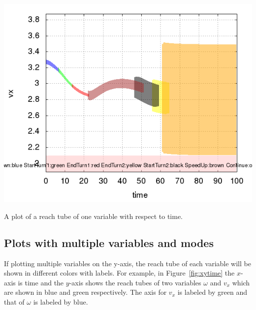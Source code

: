 \documentclass{tufte-book} %
\begin{document}
\begin{marginfigure}
 \centerline{\includegraphics[scale=.24,keepaspectratio=true]{Manual_ver0_2_image/plot_open.png}}
 \caption{A plot of a reach tube of one variable with respect to time.} 
 \label{fig:reachtube_plot}
\end{marginfigure}

\subsection{Plots with multiple variables and modes}
\label{sec:multiplots}

If plotting multiple variables on the y-axis, the reach tube of each variable will be shown in different colors with labels. For example, in Figure~\ref{fig:xytime} the $x$-axis is time and the $y$-axis shows the reach tubes of two variables $\omega$ and $v_x$ which are shown in blue and green respectively. The axis for $v_x$ is labeled by green and that of $\omega$ is labeled by blue.
\end{document}
